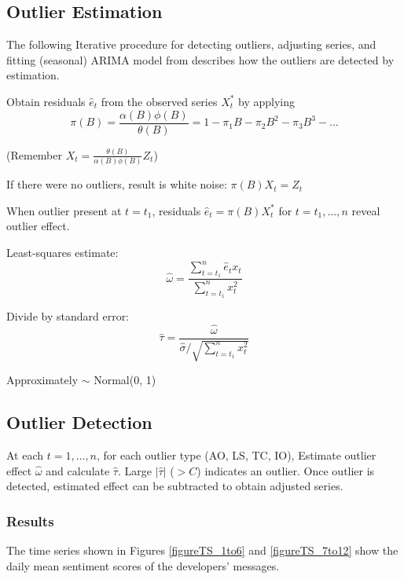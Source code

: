 \documentclass[12pt,letterpaper]{gthesis2}  %
\begin{document}
\subsection{Outlier Estimation} 

The following Iterative procedure for detecting outliers, adjusting series,
and fitting (seasonal) ARIMA model from \cite{Chen} describes how the outliers are detected by estimation. 

Obtain residuals $\hat{e}_t$ from the observed series $X^*_t$ by applying
\begin{equation*}
\pi(B) = \frac{\alpha(B) \phi(B)}{\theta(B)} = 1 - \pi_1B - \pi_2B^2 - \pi_3B^3 - ...
\end{equation*}

(Remember $X_t = \frac{\theta(B)}{\alpha(B) \phi(B)} Z_t$)

If there were no outliers, result is white noise: $\pi(B) X_t = Z_t$

When outlier present at $t = t_1$, residuals $\hat{e}_t = \pi(B) X^*_t$ for $t = t_1, \dots, n$ reveal outlier effect.

Least-squares estimate:
\begin{equation*}
\hat{\omega} = \frac{\sum_{t = t_1}^{n} \hat{e}_t x_{t}}{\sum_{t = t_1}^{n} x^2_{t}}
\end{equation*}

Divide by standard error:
\begin{equation*}
\hat{\tau} = \frac{\hat{\omega}}{\hat{\sigma} / \sqrt{\sum_{t = t_1}^{n} x^2_t}}
\end{equation*}

Approximately $\sim$ Normal(0, 1)

\subsection{Outlier Detection}

At each $t = 1, \dots, n$, for each outlier type (AO, LS, TC, IO), Estimate outlier effect $\hat{\omega}$ and calculate $\hat{\tau}$. Large $|\hat{\tau}|$ ($> C$) indicates an outlier. Once outlier is detected, estimated effect can be subtracted to obtain adjusted series.\cite{Chen}

\subsubsection{Results}

The time series shown in Figures \ref{figureTS_1to6} and \ref{figureTS_7to12} show the daily mean sentiment scores of the developers' messages.
\end{document}
